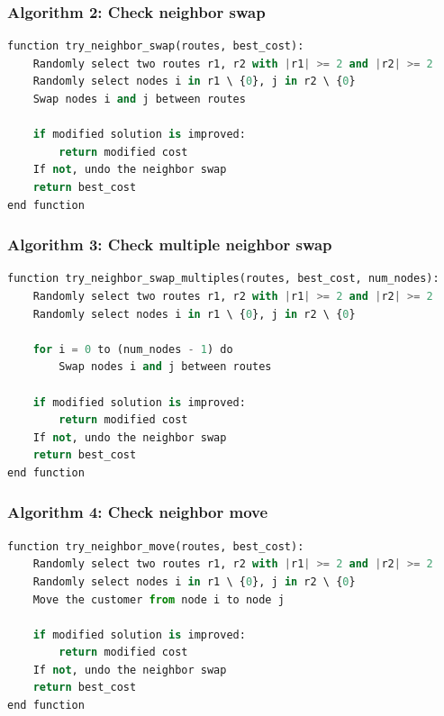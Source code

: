 \documentclass[11pt]{article}
\begin{document}
\subsubsection{Algorithm 2: Check neighbor swap}
\begin{lstlisting}[language=Python]
function try_neighbor_swap(routes, best_cost):
    Randomly select two routes r1, r2 with |r1| >= 2 and |r2| >= 2
    Randomly select nodes i in r1 \ {0}, j in r2 \ {0}
    Swap nodes i and j between routes

    if modified solution is improved:
        return modified cost
    If not, undo the neighbor swap
    return best_cost
end function
\end{lstlisting}

\subsubsection{Algorithm 3: Check multiple neighbor swap}
\begin{lstlisting}[language=Python]
function try_neighbor_swap_multiples(routes, best_cost, num_nodes):
    Randomly select two routes r1, r2 with |r1| >= 2 and |r2| >= 2
    Randomly select nodes i in r1 \ {0}, j in r2 \ {0}

    for i = 0 to (num_nodes - 1) do
        Swap nodes i and j between routes

    if modified solution is improved:
        return modified cost
    If not, undo the neighbor swap
    return best_cost
end function
\end{lstlisting}

\subsubsection{Algorithm 4: Check neighbor move}
\begin{lstlisting}[language=Python]
function try_neighbor_move(routes, best_cost):
    Randomly select two routes r1, r2 with |r1| >= 2 and |r2| >= 2
    Randomly select nodes i in r1 \ {0}, j in r2 \ {0}
    Move the customer from node i to node j
    
    if modified solution is improved:
        return modified cost
    If not, undo the neighbor swap
    return best_cost
end function
\end{lstlisting}
\end{document}
